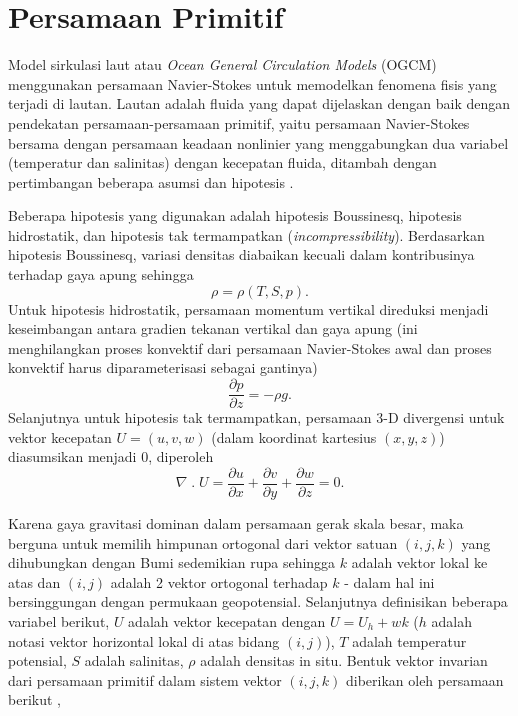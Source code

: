 \section[Persamaan Primitif]{Persamaan Primitif}
\begin{spacing}{1.5}
	\par Model sirkulasi laut atau \textit{Ocean General Circulation Models} (OGCM) menggunakan persamaan Navier-Stokes untuk memodelkan fenomena fisis yang terjadi di lautan. Lautan adalah fluida yang dapat dijelaskan dengan baik dengan pendekatan persamaan-persamaan primitif, yaitu persamaan Navier-Stokes bersama dengan persamaan keadaan nonlinier yang menggabungkan dua variabel (temperatur dan salinitas) dengan kecepatan fluida, ditambah dengan pertimbangan beberapa asumsi dan hipotesis .
	
	Beberapa hipotesis yang digunakan adalah hipotesis Boussinesq, hipotesis hidrostatik, dan hipotesis tak termampatkan (\textit{incompressibility}). Berdasarkan hipotesis Boussinesq, variasi densitas diabaikan kecuali dalam kontribusinya terhadap gaya apung sehingga 
	\begin{equation}\label{eq:P1}
		\rho = \rho(T,S,p).
	\end{equation}
	Untuk hipotesis hidrostatik, persamaan momentum vertikal direduksi menjadi keseimbangan antara gradien tekanan vertikal dan gaya apung (ini menghilangkan proses konvektif dari persamaan Navier-Stokes awal dan proses konvektif harus diparameterisasi sebagai gantinya)
	\begin{equation}
		\frac{\partial p}{\partial z} = -\rho g.
	\end{equation}
	Selanjutnya untuk hipotesis tak termampatkan, persamaan 3-D divergensi untuk vektor kecepatan $U = (u,v,w)$ (dalam koordinat kartesius $(x,y,z)$) diasumsikan menjadi 0, diperoleh
	\begin{equation}
		\nabla \;.\; U =\frac{\partial u}{\partial x} + \frac{\partial v}{\partial y} + \frac{\partial w}{\partial z} = 0.
	\end{equation}	

	Karena gaya gravitasi dominan dalam persamaan gerak skala besar, maka berguna untuk memilih himpunan ortogonal dari vektor satuan $(i,j,k)$ yang dihubungkan dengan Bumi sedemikian rupa sehingga $k$ adalah vektor lokal ke atas dan $(i,j)$ adalah 2 vektor ortogonal terhadap $k$ - dalam hal ini bersinggungan dengan permukaan geopotensial. Selanjutnya definisikan beberapa variabel berikut, $U$ adalah vektor kecepatan dengan $U = U_h + wk$ ($h$ adalah notasi vektor horizontal lokal di atas bidang $(i,j)$), $T$ adalah temperatur potensial, $S$ adalah salinitas, $\rho$ adalah densitas in situ. Bentuk vektor invarian dari persamaan primitif dalam sistem vektor $(i, j, k)$ diberikan oleh persamaan berikut ,
	

\end{spacing}
